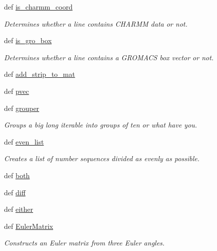 \begin{DoxyCompactItemize}
def \hyperlink{namespaceforcebalance_1_1molecule_a838d85848bd817e801d0f5f6502217ef}{is\-\_\-charmm\-\_\-coord}
\begin{DoxyCompactList}\small\item\em Determines whether a line contains C\-H\-A\-R\-M\-M data or not. \end{DoxyCompactList}\item 
def \hyperlink{namespaceforcebalance_1_1molecule_aafc8c924eed4480fed8ddc9c474d3bc1}{is\-\_\-gro\-\_\-box}
\begin{DoxyCompactList}\small\item\em Determines whether a line contains a G\-R\-O\-M\-A\-C\-S box vector or not. \end{DoxyCompactList}\item 
def \hyperlink{namespaceforcebalance_1_1molecule_a4cdb2086978b281ed84cd66179c3f5b2}{add\-\_\-strip\-\_\-to\-\_\-mat}
\item 
def \hyperlink{namespaceforcebalance_1_1molecule_a58c3f09152db4d1c6e1db9df29c60c43}{pvec}
\item 
def \hyperlink{namespaceforcebalance_1_1molecule_a7fe52c2928c7b0329882541bef2e34cd}{grouper}
\begin{DoxyCompactList}\small\item\em Groups a big long iterable into groups of ten or what have you. \end{DoxyCompactList}\item 
def \hyperlink{namespaceforcebalance_1_1molecule_a5f529179461765fadbd0a742cdc2c677}{even\-\_\-list}
\begin{DoxyCompactList}\small\item\em Creates a list of number sequences divided as evenly as possible. \end{DoxyCompactList}\item 
def \hyperlink{namespaceforcebalance_1_1molecule_a5b50df23cc4d0e617fdc56538f0bea63}{both}
\item 
def \hyperlink{namespaceforcebalance_1_1molecule_a6f7c6217b1c64da309a8abd21dfdcf08}{diff}
\item 
def \hyperlink{namespaceforcebalance_1_1molecule_a75775be6563ad7f10695a9a45ff49ba9}{either}
\item 
def \hyperlink{namespaceforcebalance_1_1molecule_af02bf73765f34bbef81c4a5b000b86ce}{Euler\-Matrix}
\begin{DoxyCompactList}\small\item\em Constructs an Euler matrix from three Euler angles. \end{DoxyCompactList}\item 

\end{DoxyCompactItemize}
